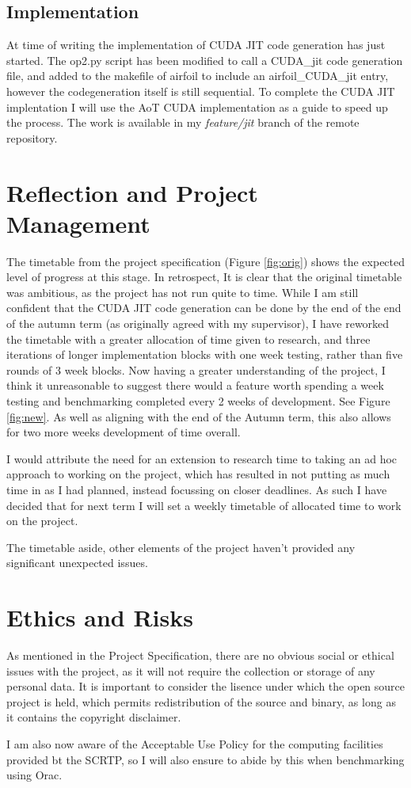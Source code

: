 \documentclass[11pt]{article}
\begin{document}
\subsection*{Implementation}
At time of writing the implementation of CUDA JIT code generation has just started. The op2.py script has been modified to call a CUDA\_jit code generation file, and added to the makefile of airfoil to include an airfoil\_CUDA\_jit entry, however the codegeneration itself is still sequential. To complete the CUDA JIT implentation I will use the AoT CUDA implementation as a guide to speed up the process. The work is available in my \textit{feature/jit} branch of the remote repository.

\section*{Reflection and Project Management}
The timetable from the project specification (Figure \ref{fig:orig}) shows the expected level of progress at this stage. In retrospect, It is clear that the original timetable was ambitious, as the project has not run quite to time. While I am still confident that the CUDA JIT code generation can be done by the end of the end of the autumn term (as originally agreed with my supervisor), I have reworked the timetable with a greater allocation of time given to research, and three iterations of longer implementation blocks with one week testing, rather than five rounds of 3 week blocks. Now having a greater understanding of the project, I think it unreasonable to suggest there would a feature worth spending a week testing and benchmarking completed every 2 weeks of development. See Figure \ref{fig:new}. As well as aligning with the end of the Autumn term, this also allows for two more weeks development of time overall.
\par I would attribute the need for an extension to research time to taking an ad hoc approach to working on the project, which has resulted in not putting as much time in as I had planned, instead focussing on closer deadlines. As such I have decided that for next term I will set a weekly timetable of allocated time to work on the project.
\par The timetable aside, other elements of the project haven't provided any significant unexpected issues. 

\section*{Ethics and Risks}
As mentioned in the Project Specification, there are no obvious social or ethical issues with the project, as it will not require the collection or storage of any personal data. It is important to consider the lisence under which the open source project is held, which permits redistribution of the source and binary, as long as it contains the copyright disclaimer.
\par I am also now aware of the Acceptable Use Policy\cite{aup} for the computing facilities provided bt the SCRTP, so I will also ensure to abide by this when benchmarking using Orac.
\end{document}
